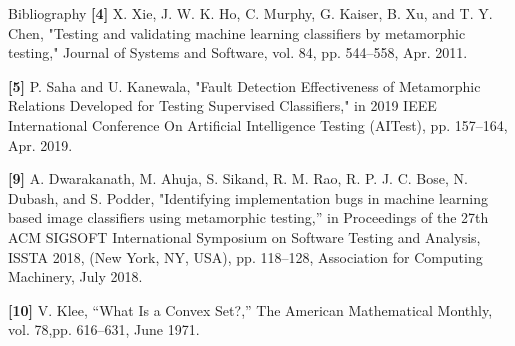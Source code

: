\documentclass[aspectratio=169,dvipsnames]{beamer}
\begin{document}
\begin{frame}{Bibliography}
	\scriptsize
	\textbf{[4]} X. Xie, J. W. K. Ho, C. Murphy, G. Kaiser, B. Xu, and T. Y. Chen, "Testing and validating machine learning classifiers by metamorphic testing," Journal of Systems and Software, vol. 84, pp. 544–558, Apr. 2011.

	\vspace{0.25cm}
	\textbf{[5]} P. Saha and U. Kanewala, "Fault Detection Effectiveness of Metamorphic Relations Developed for Testing Supervised Classifiers,"  in 2019 IEEE International Conference On Artificial Intelligence Testing (AITest), pp. 157–164, Apr. 2019.

	\vspace{0.25cm}
	\textbf{[9]} A. Dwarakanath, M. Ahuja, S. Sikand, R. M. Rao, R. P. J. C. Bose, N. Dubash, and S. Podder, "Identifying implementation bugs in machine learning based image classifiers using metamorphic testing,” in Proceedings of the 27th ACM SIGSOFT International Symposium on Software Testing and Analysis, ISSTA 2018, (New York, NY, USA), pp. 118–128, Association for Computing Machinery, July 2018.

	\vspace{0.25cm}
	\textbf{[10]} V. Klee, “What Is a Convex Set?,” The American Mathematical Monthly, vol. 78,pp. 616–631, June 1971.
\end{frame}
\end{document}
